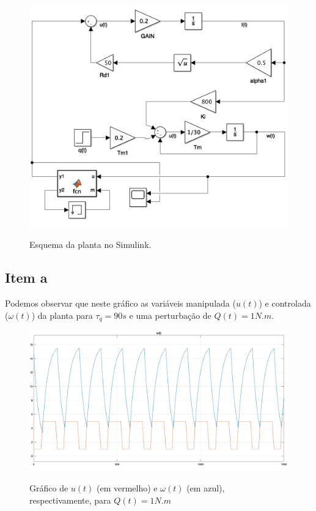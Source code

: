 \documentclass[11pt]{article}
\begin{document}
\begin{figure}[H]
	\centering
	{\includegraphics[width=\textwidth]
		{assets/q4_ab_control_schema.jpg}}
	\caption{Esquema da planta no Simulink.}
\end{figure}

\subsection{Item a}

Podemos observar que neste gráfico as variáveis manipulada ($u(t)$) e controlada ($\omega(t)$) da planta para
$ \tau_{q} =90s $ e uma perturbação de $Q(t) = 1 N.m$.

\begin{figure}[H]
	\centering
	{\includegraphics[width=\textwidth]
		{assets/q4_a_plot.png}}
	\caption{Gráfico de $u(t)$ (em vermelho) e $\omega(t)$ (em azul), respectivamente, para $Q(t) = 1 N.m$}
\end{figure}
\end{document}
